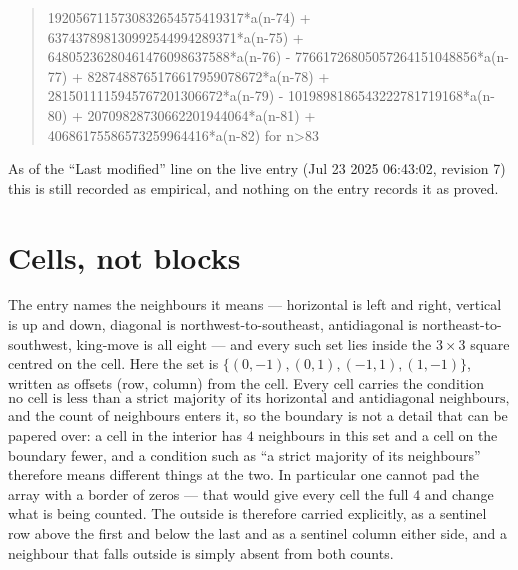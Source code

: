 \documentclass[11pt,a4paper]{article}
\theoremstyle{plain}
\theoremstyle{definition}
\begin{document}
\begin{quote}
1920567115730832654575419317*a(n-74) + 637437898130992544994289371*a(n-75) + 64805236280461476098637588*a(n-76) - 77661726805057264151048856*a(n-77) + 8287488765176617959078672*a(n-78) + 2815011115945767201306672*a(n-79) - 1019898186543222781719168*a(n-80) + 20709828730662201944064*a(n-81) + 40686175586573259964416*a(n-82) for n>83
\end{quote}
As of the ``Last modified'' line on the live entry (Jul 23 2025 06:43:02, revision 7) this is still
recorded as empirical, and nothing on the entry records it as proved.

\section{Cells, not blocks}

The entry names the neighbours it means --- horizontal is left and right, vertical is up and
down, diagonal is northwest-to-southeast, antidiagonal is northeast-to-southwest, king-move is
all eight --- and every such set lies inside the $3\times3$ square centred on the cell. Here
the set is $\{(0,-1), (0,1), (-1,1), (1,-1)\}$, written as offsets (row, column) from the cell. Every cell carries
the condition
\[
\text{no cell is less than a strict majority of its horizontal and antidiagonal neighbours},
\]
and the count of neighbours enters it, so the boundary is not a detail that can be papered
over: a cell in the interior has $4$ neighbours in this set and a cell on the boundary
fewer, and a condition such as ``a strict majority of its neighbours'' therefore means
different things at the two. In particular one cannot pad the array with a border of zeros ---
that would give every cell the full $4$ and change what is being counted. The outside is
therefore carried
explicitly, as a sentinel row above the first and below the last and as a sentinel column
either side, and a neighbour that falls outside is simply absent from both counts.
\end{document}
